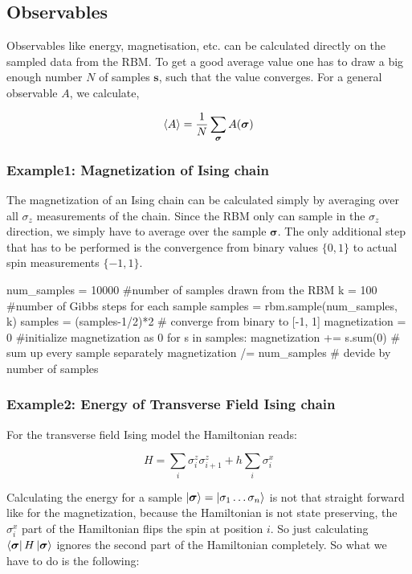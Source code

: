 \documentclass[submission, Phys]{SciPost}
\begin{document}
\subsection{Observables}

Observables like energy, magnetisation, etc. can be calculated directly on the sampled data from the RBM. To get a good average value one has to draw a big enough number $N$ of samples $\bm{s}$, such that the value converges. For a general observable $A$, we calculate,

\begin{equation}
\braket{A} = \frac{1}{N} \sum_{\bm{\sigma}} A(\bm{\sigma})
\end{equation}

\subsubsection{Example1: Magnetization of Ising chain}

The magnetization of an Ising chain can be calculated simply by averaging over all $\sigma_z$ measurements of the chain. Since the RBM only can sample in the $\sigma_z$ direction, we simply have to average over the sample $\bm{\sigma}$. The only additional step that has to be performed is the convergence from binary values $\{0,1  \}$ to actual spin measurements $\{-1 ,1  \}$.

\begin{python}
num_samples = 10000 #number of samples drawn from the RBM
k = 100 #number of Gibbs steps for each sample
samples = rbm.sample(num_samples, k)
samples = (samples-1/2)*2 # converge from binary to [-1, 1]
magnetization = 0 #initialize magnetization as 0
for s in samples: 
	magnetization += s.sum(0) # sum up every sample separately
magnetization /= num_samples # devide by number of samples
\end{python}

\subsubsection{Example2: Energy of Transverse Field Ising chain}

For the transverse field Ising model the Hamiltonian reads:

\begin{equation}
H = \sum_i \sigma^z_i \sigma^z_{i+1} + h \sum_i \sigma^x_{i}
\end{equation}

Calculating the energy for a sample $\ket{\bm{\sigma} }= \ket{\sigma_1 \dots  \sigma_n}$ is not that straight forward like for the magnetization, because the Hamiltonian is not state preserving, the $\sigma^x_i$ part of the Hamiltonian flips the spin at position $i$. So just calculating $\bra{\bm{\sigma} } H \ket{\bm{\sigma} }$ ignores the second part of the Hamiltonian completely. So what we have to do is the following:
\end{document}
